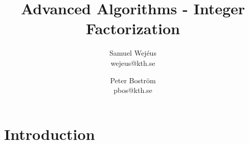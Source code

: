 \documentclass[a4paper,12pt,oneside]{article}
\title{Advanced Algorithms - Integer Factorization}
\author{Samuel Wej\'eus \\ \lowercase{wejeus@kth.se} \and Peter Boström \\ \lowercase{pbos@kth.se} }
\begin{document}
\maketitle

\section{Introduction}

\begin{thebibliography}{9}

\end{thebibliography}
\end{document}
